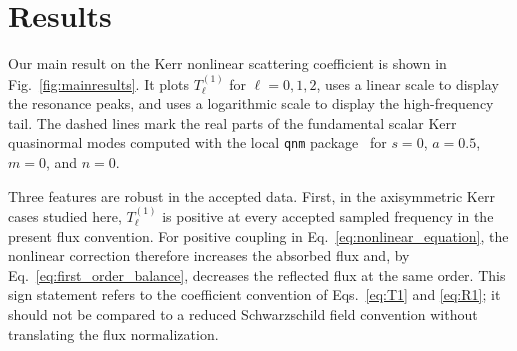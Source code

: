 \documentclass[aps,prd,twocolumn,10pt,nofootinbib,superscriptaddress,floatfix]{revtex4-2}
\begin{document}
\section{Results}
\label{sec:results}

Our main result on the Kerr nonlinear scattering coefficient is shown in
Fig.~\ref{fig:mainresults}.  It plots $T_\ell^{(1)}$ for $\ell=0,1,2$, uses a
linear scale to display the resonance peaks, and uses a logarithmic scale to
display the high-frequency tail.  The dashed lines mark the real parts of the
fundamental scalar Kerr quasinormal modes computed with the local
\texttt{qnm} package~\cite{Stein2019} for $s=0$, $a=0.5$, $m=0$, and $n=0$.

Three features are robust in the accepted data.  First, in the axisymmetric
Kerr cases studied here, $T_\ell^{(1)}$ is positive at every accepted sampled
frequency in the present flux
convention.  For positive coupling in Eq.~\eqref{eq:nonlinear_equation}, the
nonlinear correction therefore increases the absorbed flux and, by
Eq.~\eqref{eq:first_order_balance}, decreases the reflected flux at the same
order.  This sign statement refers to the coefficient convention of
Eqs.~\eqref{eq:T1} and \eqref{eq:R1}; it should not be compared to a reduced
Schwarzschild field convention without translating the flux normalization.
\end{document}
